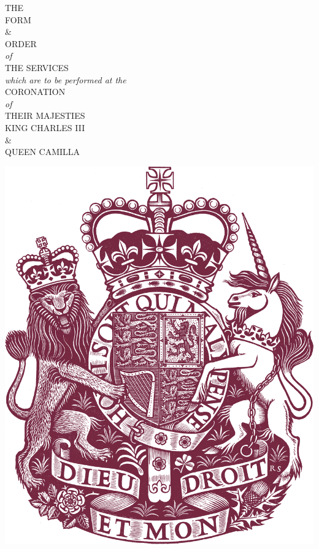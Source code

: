 \thispagestyle{empty}
\color{qred} 
\mbox{}\vfill
{\begin{center}

\LARGE  
{\scshape\MakeUppercase{The}}\\
{\scshape\MakeUppercase{Form}}\\ 
 \&\\{\scshape\MakeUppercase{Order}}\\
\normalfont\textit{of}\\
{\scshape\MakeUppercase{The Services}}\\
\normalfont\textit{which are to be performed at the}\\
{\scshape CORONATION}\\
 \textit{of}\\
\textsc{THEIR MAJESTIES}\\
\textsc{KING CHARLES III}\\
\&
\\
\textsc{QUEEN CAMILLA}

\vfill 

\includegraphics[width=.475\textwidth]{greatest-coa-qred.png}

\end{center}
\clearpage\mbox{}\color{black}






\thispagestyle{empty}\clearpage


\vfill




\vfill {}
\vfill{}
\vfill 
{}

\vfill

}

